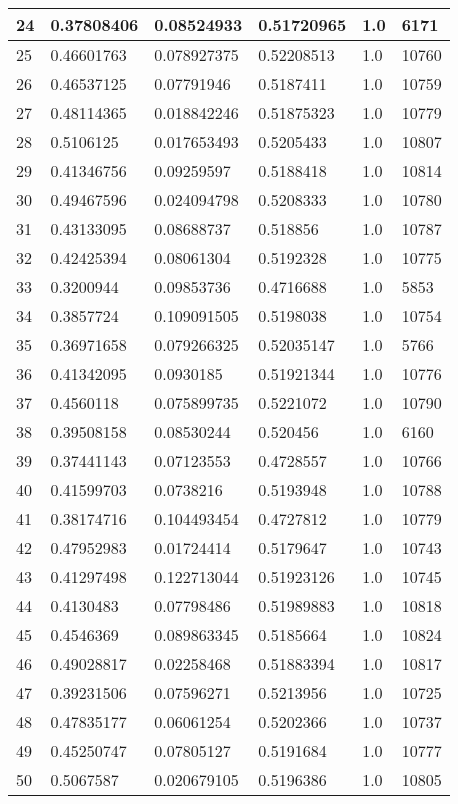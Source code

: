 \begin{longtable}{|l|l|l|l|l|l|}
24 & 0.37808406 & 0.08524933 & 0.51720965 & 1.0 & 6171 \\ \hline 
25 & 0.46601763 & 0.078927375 & 0.52208513 & 1.0 & 10760 \\ \hline 
26 & 0.46537125 & 0.07791946 & 0.5187411 & 1.0 & 10759 \\ \hline 
27 & 0.48114365 & 0.018842246 & 0.51875323 & 1.0 & 10779 \\ \hline 
28 & 0.5106125 & 0.017653493 & 0.5205433 & 1.0 & 10807 \\ \hline 
29 & 0.41346756 & 0.09259597 & 0.5188418 & 1.0 & 10814 \\ \hline 
30 & 0.49467596 & 0.024094798 & 0.5208333 & 1.0 & 10780 \\ \hline 
31 & 0.43133095 & 0.08688737 & 0.518856 & 1.0 & 10787 \\ \hline 
32 & 0.42425394 & 0.08061304 & 0.5192328 & 1.0 & 10775 \\ \hline 
33 & 0.3200944 & 0.09853736 & 0.4716688 & 1.0 & 5853 \\ \hline 
34 & 0.3857724 & 0.109091505 & 0.5198038 & 1.0 & 10754 \\ \hline 
35 & 0.36971658 & 0.079266325 & 0.52035147 & 1.0 & 5766 \\ \hline 
36 & 0.41342095 & 0.0930185 & 0.51921344 & 1.0 & 10776 \\ \hline 
37 & 0.4560118 & 0.075899735 & 0.5221072 & 1.0 & 10790 \\ \hline 
38 & 0.39508158 & 0.08530244 & 0.520456 & 1.0 & 6160 \\ \hline 
39 & 0.37441143 & 0.07123553 & 0.4728557 & 1.0 & 10766 \\ \hline 
40 & 0.41599703 & 0.0738216 & 0.5193948 & 1.0 & 10788 \\ \hline 
41 & 0.38174716 & 0.104493454 & 0.4727812 & 1.0 & 10779 \\ \hline 
42 & 0.47952983 & 0.01724414 & 0.5179647 & 1.0 & 10743 \\ \hline 
43 & 0.41297498 & 0.122713044 & 0.51923126 & 1.0 & 10745 \\ \hline 
44 & 0.4130483 & 0.07798486 & 0.51989883 & 1.0 & 10818 \\ \hline 
45 & 0.4546369 & 0.089863345 & 0.5185664 & 1.0 & 10824 \\ \hline 
46 & 0.49028817 & 0.02258468 & 0.51883394 & 1.0 & 10817 \\ \hline 
47 & 0.39231506 & 0.07596271 & 0.5213956 & 1.0 & 10725 \\ \hline 
48 & 0.47835177 & 0.06061254 & 0.5202366 & 1.0 & 10737 \\ \hline 
49 & 0.45250747 & 0.07805127 & 0.5191684 & 1.0 & 10777 \\ \hline 
50 & 0.5067587 & 0.020679105 & 0.5196386 & 1.0 & 10805 \\ \hline 
\end{longtable}